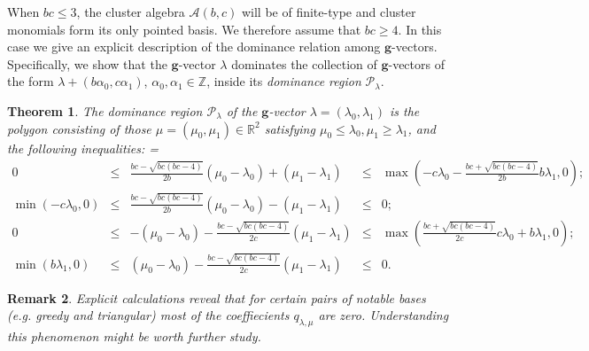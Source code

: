\documentclass{amsart}
\newtheorem{theorem}{Theorem}
\newtheorem{remark}[theorem]{Remark}
\numberwithin{theorem}{section}
\newcommand{\bfg}{\boldsymbol{g}}
\newcommand{\cA}{\mathcal{A}}
\newcommand{\cP}{\mathcal{P}}
\newcommand{\RR}{\mathbb{R}}
\newcommand{\ZZ}{\mathbb{Z}}
\begin{document}
  When $bc\le3$, the cluster algebra $\cA(b,c)$ will be of finite-type and cluster monomials form its only pointed basis.
  We therefore assume that $bc\ge4$.
  In this case we give an explicit description of the dominance relation among $\bfg$-vectors.
  Specifically, we show that the $\bfg$-vector $\lambda$ dominates the collection of $\bfg$-vectors of the form $\lambda+(b \alpha_0 ,c \alpha_1)$, $\alpha_0,\alpha_1\in\ZZ$, inside its \emph{dominance region} $\cP_\lambda$.
  \begin{theorem}
    \label{th:dominance inequalities}
    The dominance region $\cP_\lambda$ of the $\bfg$-vector $\lambda=(\lambda_0,\lambda_1)$ is the polygon consisting of those $\mu=(\mu_0,\mu_1)\in\RR^2$ satisfying $\mu_0 \leq \lambda_0, \mu_1 \geq\lambda_1$, and the following inequalities:
    {
      \everymath={\displaystyle}
      \def\arraystretch{2.2}
      \[
        \begin{array}{rcccl}
          0 & \!\leq\! & \frac{b c-\sqrt{b c (b c-4)}}{2 b}(\mu_0-\lambda_0)+(\mu_1-\lambda_1) & \!\leq\! & \max\left(-c\lambda_0-\frac{b c+\sqrt{b c (b c-4)}}{2b}b\lambda_1,0\right)\!\!;
          \\
          \min\left(-c\lambda_0,0\right) & \!\leq\! & \frac{b c-\sqrt{b c (b c-4)}}{2 b}(\mu_0-\lambda_0)-(\mu_1-\lambda_1) & \!\leq\! & 0;
          \\
          0 & \!\leq\! &  -(\mu_0-\lambda_0)-\frac{b c-\sqrt{b c (b c-4)}}{2 c}(\mu_1-\lambda_1) & \!\leq\! & \max\left(\frac{b c+\sqrt{b c (b c-4)}}{2c}c\lambda_0+b\lambda_1,0\right)\!\!;
          \\
          \min\left(b \lambda_1,0\right) & \!\leq\! & (\mu_0-\lambda_0) - \frac{b c-\sqrt{b c (b c-4)}}{2 c} (\mu_1-\lambda_1) & \!\leq\! & 0.
        \end{array}
      \]
    }
    
  \vspace{-1.05em}
  \end{theorem}
  \begin{remark}
    Explicit calculations reveal that for certain pairs of notable bases (e.g. greedy and triangular) most of the coeffiecients $q_{\lambda,\mu}$ are zero.
    Understanding this phenomenon might be worth further study.
  \end{remark}
\end{document}
